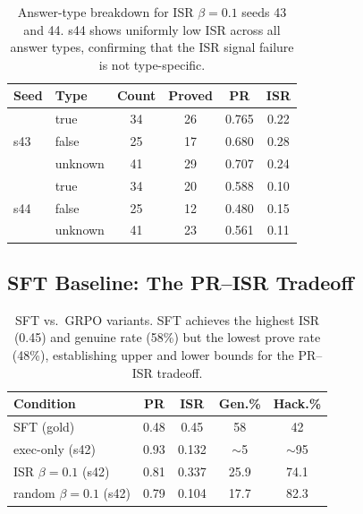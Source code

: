 \documentclass[11pt,a4paper]{article}
\begin{document}
\begin{table}[t]
\centering
\small
\begin{tabular}{llcccc}
\toprule
\textbf{Seed} & \textbf{Type} & \textbf{Count} & \textbf{Proved} & \textbf{PR} & \textbf{ISR} \\
\midrule
\multirow{3}{*}{s43} & true & 34 & 26 & 0.765 & 0.22 \\
 & false & 25 & 17 & 0.680 & 0.28 \\
 & unknown & 41 & 29 & 0.707 & 0.24 \\
\midrule
\multirow{3}{*}{s44} & true & 34 & 20 & 0.588 & 0.10 \\
 & false & 25 & 12 & 0.480 & 0.15 \\
 & unknown & 41 & 23 & 0.561 & 0.11 \\
\bottomrule
\end{tabular}
\caption{Answer-type breakdown for ISR $\beta{=}0.1$ seeds 43 and 44. s44 shows uniformly low ISR across all answer types, confirming that the ISR signal failure is not type-specific.}
\label{tab:perseed-detail}
\end{table}

\subsection{SFT Baseline: The PR--ISR Tradeoff}

\begin{table}[t]
\centering
\small
\begin{tabular}{lcccc}
\toprule
\textbf{Condition} & \textbf{PR} & \textbf{ISR} & \textbf{Gen.\%} & \textbf{Hack.\%} \\
\midrule
SFT (gold) & 0.48 & 0.45 & 58 & 42 \\
exec-only (s42) & 0.93 & 0.132 & ${\sim}$5 & ${\sim}$95 \\
ISR $\beta{=}0.1$ (s42) & 0.81 & 0.337 & 25.9 & 74.1 \\
random $\beta{=}0.1$ (s42) & 0.79 & 0.104 & 17.7 & 82.3 \\
\bottomrule
\end{tabular}
\caption{SFT vs.\ GRPO variants. SFT achieves the highest ISR (0.45) and genuine rate (58\%) but the lowest prove rate (48\%), establishing upper and lower bounds for the PR--ISR tradeoff.}
\label{tab:sft}
\end{table}
\end{document}
